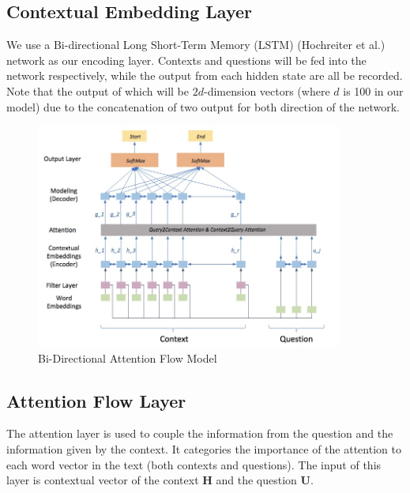 \documentclass{article} %
\begin{document}
\subsection{Contextual Embedding Layer}

We use a Bi-directional Long Short-Term Memory (LSTM) (Hochreiter et al.) network as our encoding layer. Contexts and questions will be fed into the network respectively, while the output from each hidden state are all be recorded. Note that the output of which will be $2d$-dimension vectors (where $d$ is 100 in our model) due to the concatenation of two output for both direction of the network.

\begin{figure}[h]
\begin{center}
\includegraphics[width=0.9\textwidth]{withfilter.jpeg}
\end{center}
\caption{Bi-Directional Attention Flow Model }
\end{figure}

\subsection{Attention Flow Layer}

The attention layer is used to couple the information from the question and the information given by the context. It categories the importance of the attention to each word vector in the text (both contexts and questions). The input of this layer is contextual vector of the context $\textbf{H}$ and the question $\textbf{U}$.
\end{document}
